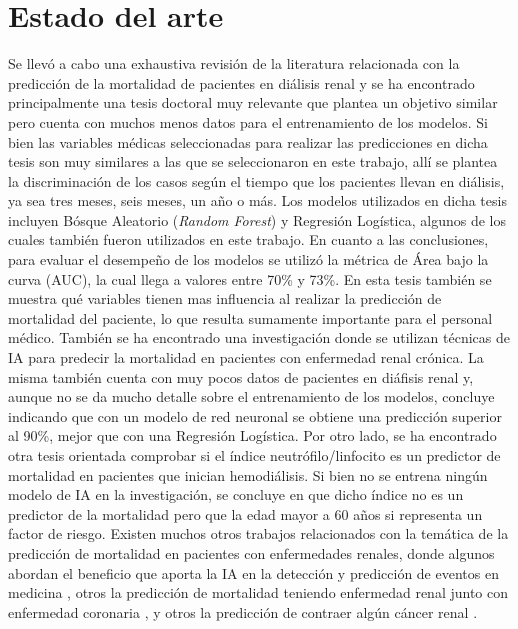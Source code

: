 
\section{Estado del arte}

Se llevó a cabo una exhaustiva revisión de la literatura relacionada con la predicción de la mortalidad de pacientes en diálisis renal y se ha encontrado principalmente una tesis doctoral \citep{ARTICULO3} muy relevante que plantea un objetivo similar pero cuenta con muchos menos datos para el entrenamiento de los modelos. Si bien las variables médicas seleccionadas para realizar las predicciones en dicha tesis son muy similares a las que se seleccionaron en este trabajo, allí se plantea la discriminación de los casos según el tiempo que los pacientes llevan en diálisis, ya sea tres meses, seis meses, un año o más. Los modelos utilizados en dicha tesis incluyen Bósque Aleatorio (\textit{Random Forest}) y Regresión Logística, algunos de los cuales también fueron utilizados en este trabajo.
En cuanto a las conclusiones, para evaluar el desempeño de los modelos se utilizó la métrica de Área bajo la curva (AUC), la cual llega a valores entre 70\% y 73\%.
En esta tesis también se muestra qué variables tienen mas influencia al realizar la predicción de mortalidad del paciente, lo que resulta sumamente importante para el personal médico.
También se ha encontrado una investigación \citep{ARTICULO4} donde se utilizan técnicas de IA para predecir la mortalidad en pacientes con enfermedad renal crónica. La misma también cuenta con muy pocos datos de pacientes en diáfisis renal y, aunque no se da mucho detalle sobre el entrenamiento de los modelos, concluye indicando que con un modelo de red neuronal se obtiene una predicción superior al 90\%, mejor que con una Regresión Logística.
Por otro lado, se ha encontrado otra tesis \citep{ARTICULO5} orientada comprobar si el índice neutrófilo/linfocito es un predictor de mortalidad en pacientes que inician hemodiálisis. Si bien no se entrena ningún modelo de IA en la investigación, se concluye en que dicho índice no es un predictor de la mortalidad pero que la edad mayor a 60 años si representa un factor de riesgo. 
Existen muchos otros trabajos relacionados con la temática de la predicción de mortalidad en pacientes con enfermedades renales, donde algunos abordan el beneficio que aporta la IA en la detección y predicción de eventos en medicina \citep{ARTICULO6}\citep{ARTICULO7}\citep{ARTICULO9}, otros la predicción de mortalidad teniendo enfermedad renal junto con enfermedad coronaria \citep{ARTICULO10}, y otros la predicción de contraer algún cáncer renal \citep{ARTICULO8}.

